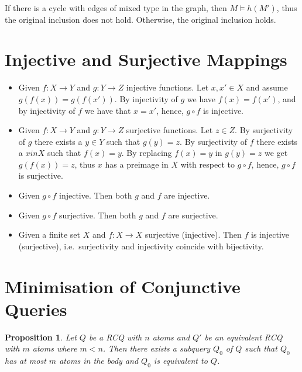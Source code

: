 \documentclass[a4paper,12pt]{article}
\newtheorem{prop}{Proposition}
\begin{document}
If there is a cycle with edges of mixed type in the graph, then $M \models h(M')$, thus the original inclusion does not hold. Otherwise, the original inclusion holds.


\section{Injective and Surjective Mappings}

\begin{itemize}
\item{Given $f : X \rightarrow Y$ and $g : Y \rightarrow Z$ injective functions.
Let $x, x' \in X$ and assume $g(f(x)) = g(f(x'))$. By injectivity of $g$ we have $f(x) = f(x')$, and by injectivity of $f$ we have that $x = x'$, hence, $g \circ f$ is injective.
}
\item{Given $f : X \rightarrow Y$ and $g : Y \rightarrow Z$ surjective functions.
Let $z \in Z$. By surjectivity of $g$ there exists a $y \in Y$ such that $g(y) = z$. By surjectivity of $f$ there exists a $x in X$ such that $f(x) = y$. By replacing $f(x) = y$ in $g(y) = z$ we get $g(f(x)) = z$, thus $x$ has a preimage in $X$ with respect to $g \circ f$, hence, $g \circ f$ is surjective.
}
\item{
Given $g \circ f$ injective. Then both $g$ and $f$ are injective.
}
\item{
Given $g \circ f$ surjective. Then both $g$ and $f$ are surjective.
}
\item{
Given a finite set $X$ and $f : X \rightarrow X$ surjective (injective). Then $f$ is injective (surjective), i.e.\ surjectivity and injectivity coincide with bijectivity.
}
\end{itemize}

\section{Minimisation of Conjunctive Queries}


\begin{prop} Let $Q$ be a RCQ with $n$ atoms and $Q'$ be an equivalent RCQ with $m$ atoms where $m < n$. Then there exists a subquery $Q_0$ of $Q$ such that $Q_0$ has at most $m$ atoms in the body and $Q_0$ is equivalent to $Q$.
\end{prop}
\end{document}
